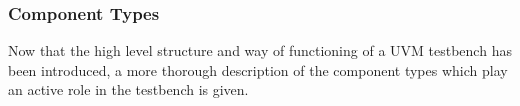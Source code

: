 \documentclass[11pt,a4paper]{report}
\begin{document}

\subsubsection{Component Types} %


Now that the high level structure and way of functioning of a UVM testbench has been introduced, a more thorough description of the component types which play an active role in the testbench is given.
\end{document}
